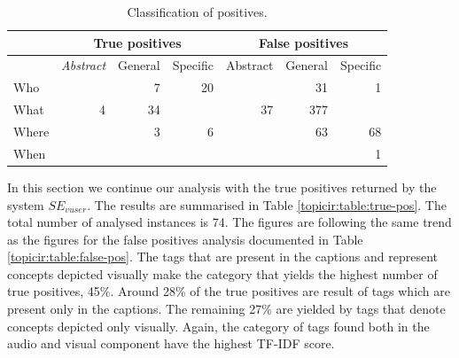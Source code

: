 \begin{table}
\centering
\begin{footnotesize}
\begin{tabular}{l|r|r|r|r|r|r}
\toprule
 & \multicolumn{3}{|c|}{\textbf{True positives}} & \multicolumn{3}{c}{\textbf{False positives}}\\
 \hline
  & \textit{Abstract} & General & Specific & Abstract & General & Specific\\
\hline
Who & & 7& 20& &31 &1\\
\hline
What &4 &34 & &37 & 377&\\
\hline
Where & & 3&6 & &63 &68\\
\hline
When & & & & & &1\\
\bottomrule
\end{tabular}
\caption{Classification of positives.}
\label{topicir:table:pan-shat}
\end{footnotesize}
\end{table}

In this section we continue our analysis with the true positives returned by the system $SE_{vuser}$. The results are summarised in Table \ref{topicir:table:true-pos}. The total number of analysed instances is 74. The figures are following the same trend as the figures for the false positives analysis documented in Table \ref{topicir:table:false-pos}. The tags that are present in the captions and represent concepts depicted visually make the category that yields the highest number of true positives, 45\%. Around 28\% of the true positives are result of tags which are present only in the captions. The remaining 27\% are yielded by tags that denote concepts depicted only visually. Again, the category of tags found both in the audio and visual component have the highest TF-IDF score.

